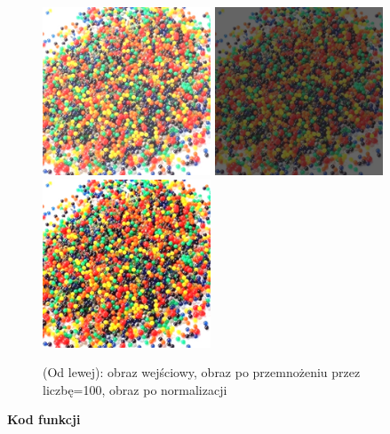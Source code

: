 \documentclass[magisterska,openany]{pracadypl}
\begin{document}
\begin{figure}[h]
\centering
\includegraphics[width=5cm, height=5cm]{orgi/RGBkulki.jpg}
\includegraphics[width=5cm, height=5cm]{4_3/multiconstRGB2.jpg}
\includegraphics[width=5cm, height=5cm]{4_3/nmulticonstRGB2.jpg}
\caption{(Od lewej): obraz wejściowy, obraz po przemnożeniu przez liczbę=100, obraz po normalizacji}
\end{figure}

\newpage
\textbf{\Large Kod funkcji}
   
\end{document}
